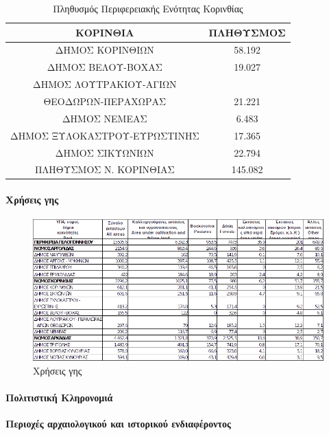 \documentclass[12pt]{article}
\begin{document}
	\begin{table}[H]
		\centering
		\begin{tabular}{|c|c|}
			\hline
			\textbf{ΚΟΡΙΝΘΙΑ} & \textbf{ΠΛΗΘΥΣΜΟΣ} \\ \hline
			ΔΗΜΟΣ ΚΟΡΙΝΘΙΩΝ & 58.192 \\ \hline
			ΔΗΜΟΣ ΒΕΛΟΥ-ΒΟΧΑΣ & 19.027 \\ \hline
			ΔΗΜΟΣ ΛΟΥΤΡΑΚΙΟΥ-ΑΓΙΩΝ & \\
			ΘΕΟΔΩΡΩΝ-ΠΕΡΑΧΩΡΑΣ & 21.221 \\ \hline
			ΔΗΜΟΣ ΝΕΜΕΑΣ & 6.483 \\ \hline
			ΔΗΜΟΣ ΞΥΛΟΚΑΣΤΡΟΥ-ΕΥΡΩΣΤΙΝΗΣ & 17.365 \\ \hline
			ΔΗΜΟΣ ΣΙΚΥΩΝΙΩΝ & 22.794 \\ \hline
			ΠΛΗΘΥΣΜΟΣ Ν. ΚΟΡΙΝΘΙΑΣ & 145.082 \\ \hline
		\end{tabular}
		\caption{Πληθυσμός Περιφερειακής Ενότητας Κορινθίας}
		\label{The label}
	\end{table}
	
	\paragraph{Χρήσεις γης}
	
	\begin{figure} [H]
		\begin{center}
			\includegraphics [scale = 0.80] {xriseis2.png}
			\caption{Χρήσεις γης}
		\end{center}
	\end{figure}

	\paragraph{Πολιτιστική Κληρονομιά}
	
	\textbf{Περιοχές αρχαιολογικού και ιστορικού ενδιαφέροντος}
	
\end{document}

